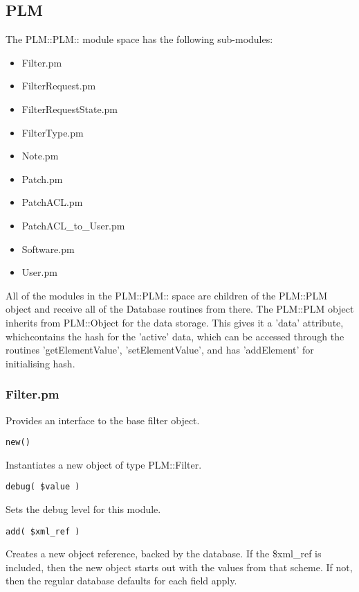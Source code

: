 \subsection{PLM}
The PLM::PLM:: module space has the following sub-modules:

\begin{itemize}
\item Filter.pm
\item FilterRequest.pm
\item FilterRequestState.pm
\item FilterType.pm
\item Note.pm
\item Patch.pm
\item PatchACL.pm
\item PatchACL\_to\_User.pm
\item Software.pm
\item User.pm
\end{itemize}

All of the modules in the PLM::PLM:: space are children of the PLM::PLM object
and receive all of the Database routines from there.  The PLM::PLM object inherits from PLM::Object for the data storage.  This gives it a 'data' attribute, whichcontains the hash for the 'active' data, which can be accessed through the routines 'getElementValue', 'setElementValue', and has 'addElement' for initialising hash.

\subsubsection{Filter.pm}
Provides an interface to the base filter object.

\begin{verbatim}
new()
\end{verbatim}
Instantiates a new object of type PLM::Filter.

\begin{verbatim}
debug( $value )
\end{verbatim}
Sets the debug level for this module.

\begin{verbatim}
add( $xml_ref )
\end{verbatim}
Creates a new object reference, backed by the database.  If the \$xml\_ref is
included, then the new object starts out with the values from that scheme.  If
not, then the regular database defaults for each field apply.

